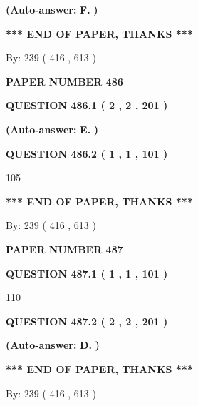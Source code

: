 \documentclass[12pt]{article}
\begin{document}
 
{\textbf{(Auto-answer:}}
{\textbf{\large{
F.}}}
{\textbf{)}}
 
 
   
   
   
   
\vspace{1.0in} 
{\textbf{\large{ *** END OF PAPER, THANKS *** }}} 
   
   
\hspace{1.0in} By: 
 239 ( 416 ,  613 )
   
   
   
   
\newpage 
\setcounter{page}{ 
   486001 } 
   
   
 {\textbf{ \Large{ PAPER NUMBER  486  }}}
   
   
   
   
  
  
{\textbf{\large{QUESTION
486.1 
 ( 2 , 2 , 201 )
}}}
 
 
{\textbf{(Auto-answer:}}
{\textbf{\large{
E.}}}
{\textbf{)}}
 
 
  
  
{\textbf{\large{QUESTION
486.2 
 ( 1 , 1 , 101 )
}}}

105
   
   
   
   
\vspace{1.0in} 
{\textbf{\large{ *** END OF PAPER, THANKS *** }}} 
   
   
\hspace{1.0in} By: 
 239 ( 416 ,  613 )
   
   
   
   
\newpage 
\setcounter{page}{ 
   487001 } 
   
   
 {\textbf{ \Large{ PAPER NUMBER  487  }}}
   
   
   
   
  
  
{\textbf{\large{QUESTION
487.1 
 ( 1 , 1 , 101 )
}}}

110
  
  
{\textbf{\large{QUESTION
487.2 
 ( 2 , 2 , 201 )
}}}
 
 
{\textbf{(Auto-answer:}}
{\textbf{\large{
D.}}}
{\textbf{)}}
 
 
   
   
   
   
\vspace{1.0in} 
{\textbf{\large{ *** END OF PAPER, THANKS *** }}} 
   
   
\hspace{1.0in} By: 
 239 ( 416 ,  613 )
   
   
   
\end{document}
